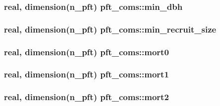\subsubsection[{\texorpdfstring{min\+\_\+dbh}{min_dbh}}]{\setlength{\rightskip}{0pt plus 5cm}real, dimension(n\+\_\+pft) pft\+\_\+coms\+::min\+\_\+dbh}\hypertarget{namespacepft__coms_a6290d41cd79d6f8ac7819f9bf06cad60}{}\label{namespacepft__coms_a6290d41cd79d6f8ac7819f9bf06cad60}
\subsubsection[{\texorpdfstring{min\+\_\+recruit\+\_\+size}{min_recruit_size}}]{\setlength{\rightskip}{0pt plus 5cm}real, dimension(n\+\_\+pft) pft\+\_\+coms\+::min\+\_\+recruit\+\_\+size}\hypertarget{namespacepft__coms_a4a008038dd34f2531f2ca7637c6e74b0}{}\label{namespacepft__coms_a4a008038dd34f2531f2ca7637c6e74b0}
\subsubsection[{\texorpdfstring{mort0}{mort0}}]{\setlength{\rightskip}{0pt plus 5cm}real, dimension(n\+\_\+pft) pft\+\_\+coms\+::mort0}\hypertarget{namespacepft__coms_a70607e766522bb0ddd5329aa60d6b5e7}{}\label{namespacepft__coms_a70607e766522bb0ddd5329aa60d6b5e7}
\subsubsection[{\texorpdfstring{mort1}{mort1}}]{\setlength{\rightskip}{0pt plus 5cm}real, dimension(n\+\_\+pft) pft\+\_\+coms\+::mort1}\hypertarget{namespacepft__coms_a8a99e260a7d72b81ec6887289e4e8172}{}\label{namespacepft__coms_a8a99e260a7d72b81ec6887289e4e8172}
\subsubsection[{\texorpdfstring{mort2}{mort2}}]{\setlength{\rightskip}{0pt plus 5cm}real, dimension(n\+\_\+pft) pft\+\_\+coms\+::mort2}\hypertarget{namespacepft__coms_a869ad0792b73ae5285eeab0a57534f34}{}\label{namespacepft__coms_a869ad0792b73ae5285eeab0a57534f34}
